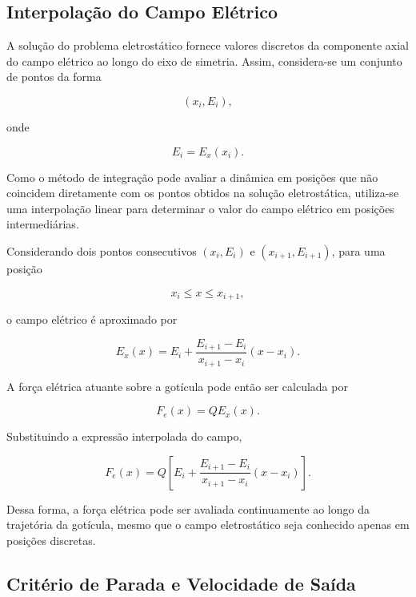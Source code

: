 \documentclass[12pt,a4paper]{article}
\begin{document}
\subsection{Interpolação do Campo Elétrico}

A solução do problema eletrostático fornece valores discretos da componente
axial do campo elétrico ao longo do eixo de simetria. Assim, considera-se um
conjunto de pontos da forma

\begin{equation}
(x_i,E_i),
\end{equation}

onde

\begin{equation}
E_i = E_x(x_i).
\end{equation}

Como o método de integração pode avaliar a dinâmica em posições que não
coincidem diretamente com os pontos obtidos na solução eletrostática, utiliza-se
uma interpolação linear para determinar o valor do campo elétrico em posições
intermediárias.

Considerando dois pontos consecutivos $(x_i,E_i)$ e
$(x_{i+1},E_{i+1})$, para uma posição

\begin{equation}
x_i \leq x \leq x_{i+1},
\end{equation}

o campo elétrico é aproximado por

\begin{equation}
E_x(x)
=
E_i
+
\frac{E_{i+1}-E_i}
{x_{i+1}-x_i}
(x-x_i).
\end{equation}

A força elétrica atuante sobre a gotícula pode então ser calculada por

\begin{equation}
F_e(x)
=
Q E_x(x).
\end{equation}

Substituindo a expressão interpolada do campo,

\begin{equation}
F_e(x)
=
Q
\left[
E_i
+
\frac{E_{i+1}-E_i}
{x_{i+1}-x_i}
(x-x_i)
\right].
\end{equation}

Dessa forma, a força elétrica pode ser avaliada continuamente ao longo da
trajetória da gotícula, mesmo que o campo eletrostático seja conhecido apenas
em posições discretas.

\subsection{Critério de Parada e Velocidade de Saída}
\end{document}
